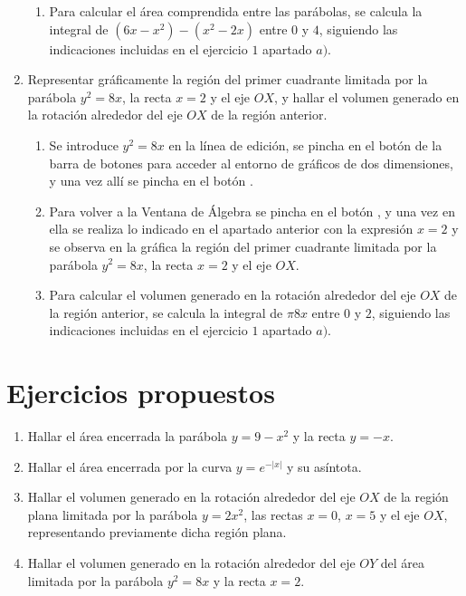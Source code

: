 \begin{enumerate}[leftmargin=*]
\begin{indication}
{\begin{enumerate}
\item Para calcular el área comprendida entre las parábolas, se
 calcula la integral de $(6x-x^{2})-(x^2-2x)$ entre $0$ y $4$, siguiendo
 las indicaciones incluidas en el ejercicio $1$ apartado $a)$.
\end{enumerate}
}
\end{indication}

\item  Representar gráficamente la región del primer cuadrante limitada
por la parábola $y^{2}=8x$, la recta $x=2$ y el eje $OX$, y hallar el volumen
generado en la rotación alrededor del eje $OX$ de la región anterior.

\begin{indication}
{
\begin{enumerate}
\item Se introduce $y^{2}=8x$ en la línea de edición, se pincha en el botón
  de la barra de botones para acceder al entorno de gráficos de dos dimensiones, y
una vez allí se pincha en el botón .

\item Para volver a la Ventana de Álgebra se pincha en el botón
, y una vez en ella se realiza
lo indicado en el apartado anterior con la expresión $x=2$ y se
observa en la gráfica la región del primer cuadrante limitada por la
parábola $y^{2}=8x$, la recta $x=2$ y el eje $OX$.

\item Para calcular el volumen generado en la rotación alrededor del eje $OX$ de la región anterior, se
 calcula la integral de $\pi8x$ entre $0$ y $2$, siguiendo
 las indicaciones incluidas en el ejercicio $1$ apartado $a)$.
\end{enumerate}
}
\end{indication}
\end{enumerate}

\section{Ejercicios propuestos}
\begin{enumerate}[leftmargin=*]
\item Hallar el área encerrada la parábola $y=9-x^{2}$ y la recta $y=-x$.
\item Hallar el área encerrada por la curva $y=e^{-|x|}$ y su asíntota.
\item Hallar el volumen generado en la rotación alrededor del eje $OX$ de la región plana limitada por la parábola $y=2x^{2}$, las rectas $x=0$, $x=5$ y el eje $OX$, representando previamente dicha región plana.
\item Hallar el volumen generado en la rotación alrededor del eje $OY$ del área limitada por la parábola $y^{2}=8x$ y la recta $x=2$.
\end{enumerate}